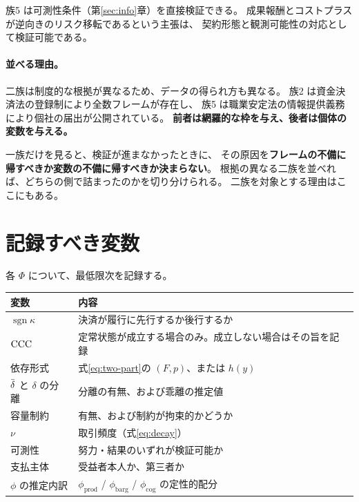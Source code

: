 族5 は可測性条件（第\ref{sec:info}章）を直接検証できる。
成果報酬とコストプラスが逆向きのリスク移転であるという主張は、
契約形態と観測可能性の対応として検証可能である。

\paragraph{並べる理由。}

二族は制度的な根拠が異なるため、データの得られ方も異なる。
族2 は資金決済法の登録制により全数フレームが存在し、
族5 は職業安定法の情報提供義務により個社の届出が公開されている。
\textbf{前者は網羅的な枠を与え、後者は個体の変数を与える。}

一族だけを見ると、検証が進まなかったときに、
その原因を\textbf{フレームの不備に帰すべきか変数の不備に帰すべきか決まらない}。
根拠の異なる二族を並べれば、どちらの側で詰まったのかを切り分けられる。
二族を対象とする理由はここにもある。

\section{記録すべき変数}

各 $\Phi$ について、最低限次を記録する。

\begin{center}
\begin{tabularx}{\textwidth}{@{}lX@{}}
\toprule
変数 & 内容 \\
\midrule
$\operatorname{sgn}\kappa$ & 決済が履行に先行するか後行するか \\
$\mathrm{CCC}$ & 定常状態が成立する場合のみ。成立しない場合はその旨を記録 \\
依存形式 & 式\eqref{eq:two-part}の $(F,p)$、または $h(y)$ \\
$\dbar$ と $\delta$ の分離 & 分離の有無、および乖離の推定値 \\
容量制約 & 有無、および制約が拘束的かどうか \\
$\nu$ & 取引頻度（式\eqref{eq:decay}） \\
可測性 & 努力・結果のいずれが検証可能か \\
支払主体 & 受益者本人か、第三者か \\
$\phi$ の推定内訳 & $\phi_{\mathrm{prod}}$ / $\phi_{\mathrm{barg}}$ / $\phi_{\mathrm{cog}}$ の定性的配分 \\
\bottomrule
\end{tabularx}
\label{tab:variables-to-record}
\end{center}

